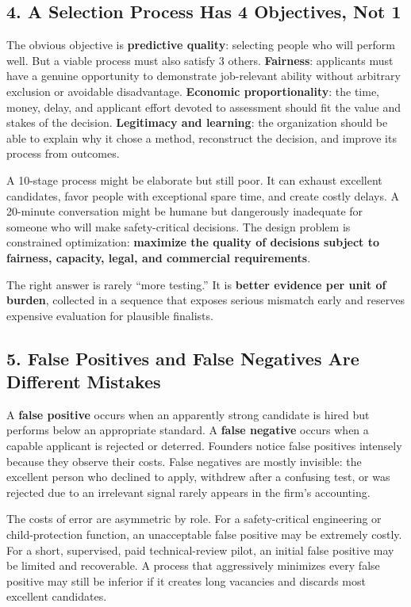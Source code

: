 \subsection*{4. A Selection Process Has 4 Objectives, Not 1}

The obvious objective is \textbf{predictive quality}: selecting people who will perform well. But a viable process must also satisfy 3 others. \textbf{Fairness}: applicants must have a genuine opportunity to demonstrate job-relevant ability without arbitrary exclusion or avoidable disadvantage. \textbf{Economic proportionality}: the time, money, delay, and applicant effort devoted to assessment should fit the value and stakes of the decision. \textbf{Legitimacy and learning}: the organization should be able to explain why it chose a method, reconstruct the decision, and improve its process from outcomes.

A 10-stage process might be elaborate but still poor. It can exhaust excellent candidates, favor people with exceptional spare time, and create costly delays. A 20-minute conversation might be humane but dangerously inadequate for someone who will make safety-critical decisions. The design problem is constrained optimization: \textbf{maximize the quality of decisions subject to fairness, capacity, legal, and commercial requirements}.

The right answer is rarely ``more testing.'' It is \textbf{better evidence per unit of burden}, collected in a sequence that exposes serious mismatch early and reserves expensive evaluation for plausible finalists.

\subsection*{5. False Positives and False Negatives Are Different Mistakes}

A \textbf{false positive} occurs when an apparently strong candidate is hired but performs below an appropriate standard. A \textbf{false negative} occurs when a capable applicant is rejected or deterred. Founders notice false positives intensely because they observe their costs. False negatives are mostly invisible: the excellent person who declined to apply, withdrew after a confusing test, or was rejected due to an irrelevant signal rarely appears in the firm's accounting.

The costs of error are asymmetric by role. For a safety-critical engineering or child-protection function, an unacceptable false positive may be extremely costly. For a short, supervised, paid technical-review pilot, an initial false positive may be limited and recoverable. A process that aggressively minimizes every false positive may still be inferior if it creates long vacancies and discards most excellent candidates.

